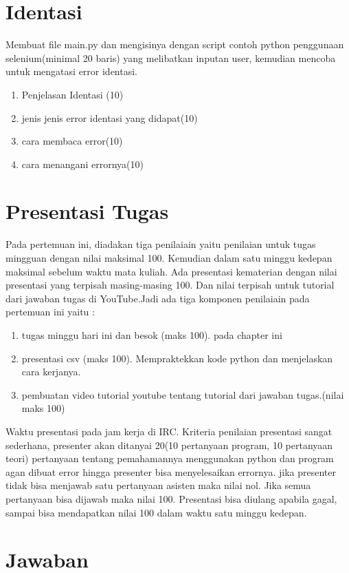 \section{Identasi}
Membuat file main.py dan mengisinya dengan script contoh python penggunaan selenium(minimal 20 baris) yang melibatkan inputan user, kemudian mencoba untuk mengatasi error identasi.
\begin{enumerate}
	\item
Penjelasan Identasi (10)
	\item
jenis jenis error identasi yang didapat(10)
\item
cara membaca error(10)
\item 
cara menangani errornya(10)
\end{enumerate}

\section{Presentasi Tugas}
Pada pertemuan ini, diadakan tiga penilaiain yaitu penilaian untuk tugas mingguan dengan nilai maksimal 100. Kemudian dalam satu minggu kedepan maksimal sebelum waktu mata kuliah. Ada presentasi kematerian dengan nilai presentasi yang terpisah masing-masing 100. Dan nilai terpisah untuk tutorial dari jawaban tugas di YouTube.Jadi ada tiga komponen penilaiain pada pertemuan ini yaitu :
\begin{enumerate}
	\item tugas minggu hari ini dan besok (maks 100). pada chapter ini
	\item presentasi csv (maks 100). Mempraktekkan kode python dan menjelaskan cara kerjanya.
	\item pembuatan video tutorial youtube tentang tutorial dari jawaban tugas.(nilai maks 100)
\end{enumerate}
Waktu presentasi pada jam kerja di IRC. Kriteria penilaian presentasi sangat sederhana, presenter akan ditanyai 20(10 pertanyaan program, 10 pertanyaan teori) pertanyaan tentang pemahamannya menggunakan python dan program agan dibuat error hingga presenter bisa menyelesaikan errornya. jika presenter tidak bisa menjawab satu pertanyaan asisten maka nilai nol. Jika semua pertanyaan bisa dijawab maka nilai 100. Presentasi bisa diulang apabila gagal, sampai bisa mendapatkan nilai 100 dalam waktu satu minggu kedepan.
\section{Jawaban}

